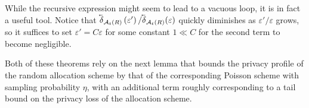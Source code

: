 \documentclass{article}
\newif\ifconferencemode
\newif\ifconferencemode
\theoremstyle{plain}
\theoremstyle{definition}
\newcommand{\eps}{\varepsilon}
\newcommand{\lvec}[1]{\reflectbox{$\vec{\reflectbox{$#1$}}$}}
\newcommand{\rand}{R}
\newcommand{\alloc}[2]{\mathcal{A}_{#1}\left(#2\right)}
\newcommand{\add}[1]{\lvec{#1}}
\newcommand{\privProfAdd}[1]{\add{\delta}_{#1}}
\begin{document}
While the recursive expression might seem to lead to a vacuous loop, it is in fact a useful tool. Notice that $\privProfAdd{\alloc{t}{\rand}}\left(\eps' \right) / \privProfAdd{\alloc{t}{\rand}}(\eps)$ quickly diminishes as $\eps' / \eps$ grows, so it suffices to set $\eps' = C \eps$ for some constant $1 \ll C$ for the second term to become negligible.
\ifconferencemode
Both parts of this theorem follow from Lemma \ref{lem:analBnd}  which bounds the privacy profile of the random allocation scheme by that of the corresponding Poisson scheme with sampling probability $\eta$, with an additional term roughly corresponding to a tail bound on the privacy loss of the allocation scheme.
\else
Both of these theorems rely on the next lemma that bounds the privacy profile of the random allocation scheme by that of the corresponding Poisson scheme with sampling probability $\eta$, with an additional term roughly corresponding to a tail bound on the privacy loss of the allocation scheme. 
\fi
\end{document}

